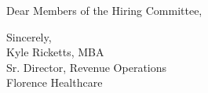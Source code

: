 \documentclass[11pt,a4paper,roman]{moderncv}
\begin{document}
\date{\today}
\opening{Dear Members of the Hiring Committee,}
\makelettertitle

\begin{justify}



\end{justify}

\vspace{0.3cm}
{Sincerely,\\
Kyle Ricketts, MBA\\
Sr. Director, Revenue Operations\\
Florence Healthcare}
\end{document}
